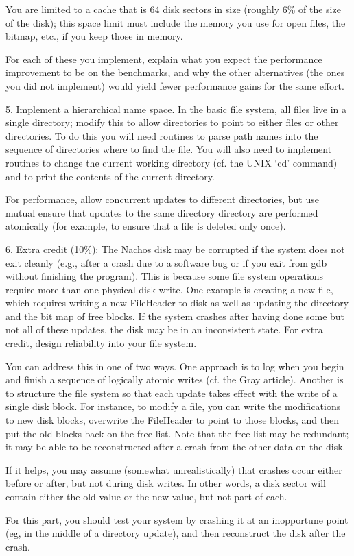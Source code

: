 \begin{description}
\begin{description}
You are limited to a cache that is 64 disk sectors in size (roughly 6\%
of the size of the disk); this space limit must include the memory you
use for open files, the bitmap, etc., if you keep those in memory.

\end{description}

For each of these you implement, explain what you expect the
performance improvement to be on the benchmarks, and why
the other alternatives (the ones you did not implement) would yield
fewer performance gains for the same effort.

\item{5.}
Implement a hierarchical name space.  In the basic file system,
all files live in a single directory; modify this to allow
directories to point to either files or other directories.
To do this you will need routines to parse path names into
the sequence of directories where to find the file.
You will also need to implement routines to change the 
current working directory (cf. the UNIX `cd' command) and to 
print the contents of the current directory.

For performance, allow concurrent updates to different directories,
but use mutual ensure that updates to the same directory directory
are performed atomically (for example, to ensure that a file is
deleted only once).

\item{6. Extra credit (10\%):}
The Nachos disk may be corrupted if the system does not 
exit cleanly (e.g., after a crash due
to a software bug or if you exit from gdb without finishing the program).
This is because some file system operations require more than one
physical disk write.  One example is creating a new file, which requires
writing a new FileHeader to disk as well as updating the directory 
and the bit map of free blocks.  If the system crashes after having
done some but not all of these updates, the disk may be in an inconsistent
state.  For extra credit, design reliability into your file system.

You can address this in one of two ways.  One approach is to 
log when you begin and finish a sequence of logically atomic 
writes (cf. the Gray article).  Another is to structure the file
system so that each update takes effect with the write of a single disk block.
For instance, to modify a file, you can write the modifications
to new disk blocks, overwrite the FileHeader to point to those blocks,
and then put the old blocks back on the free list.  Note that
the free list may be redundant; it may be able to be reconstructed after
a crash from the other data on the disk.  

If it helps, you may assume (somewhat unrealistically) that crashes occur 
either before or after, but not during disk writes.  In other
words, a disk sector will contain either the old value or the new
value, but not part of each.

For this part, you should test your system by crashing it at an
inopportune point (eg, in the middle of a directory update), and 
then reconstruct the disk after the crash.
\end{description}


